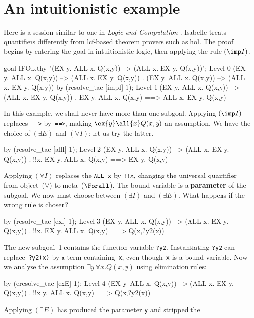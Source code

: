 \section{An intuitionistic example}
Here is a session similar to one in {\em Logic and Computation}
\cite[pages~222--3]{paulson87}.  Isabelle treats quantifiers differently
from {\sc lcf}-based theorem provers such as {\sc hol}.  The proof begins
by entering the goal in intuitionistic logic, then applying the rule
$({\imp}I)$.
\begin{ttbox}
goal IFOL.thy "(EX y. ALL x. Q(x,y)) -->  (ALL x. EX y. Q(x,y))";
{\out Level 0}
{\out (EX y. ALL x. Q(x,y)) --> (ALL x. EX y. Q(x,y))}
{. (EX y. ALL x. Q(x,y)) --> (ALL x. EX y. Q(x,y))}
\ttbreak
by (resolve_tac [impI] 1);
{\out Level 1}
{\out (EX y. ALL x. Q(x,y)) --> (ALL x. EX y. Q(x,y))}
{. EX y. ALL x. Q(x,y) ==> ALL x. EX y. Q(x,y)}
\end{ttbox}
In this example, we shall never have more than one subgoal.  Applying
$({\imp}I)$ replaces~\verb|-->| by~\verb|==>|, making
\(\ex{y}\all{x}Q(x,y)\) an assumption.  We have the choice of
$({\exists}E)$ and $({\forall}I)$; let us try the latter.
\begin{ttbox}
by (resolve_tac [allI] 1);
{\out Level 2}
{\out (EX y. ALL x. Q(x,y)) --> (ALL x. EX y. Q(x,y))}
{. !!x. EX y. ALL x. Q(x,y) ==> EX y. Q(x,y)}
\end{ttbox}
Applying $({\forall}I)$ replaces the \hbox{\tt ALL x} by \hbox{\tt!!x},
changing the universal quantifier from object~($\forall$) to
meta~($\Forall$).  The bound variable is a {\bf parameter} of the
subgoal.  We now must choose between $({\exists}I)$ and $({\exists}E)$.  What
happens if the wrong rule is chosen?
\begin{ttbox}
by (resolve_tac [exI] 1);
{\out Level 3}
{\out (EX y. ALL x. Q(x,y)) --> (ALL x. EX y. Q(x,y))}
{. !!x. EX y. ALL x. Q(x,y) ==> Q(x,?y2(x))}
\end{ttbox}
The new subgoal~1 contains the function variable {\tt?y2}.  Instantiating
{\tt?y2} can replace~{\tt?y2(x)} by a term containing~{\tt x}, even
though~{\tt x} is a bound variable.  Now we analyse the assumption
\(\exists y.\forall x. Q(x,y)\) using elimination rules:
\begin{ttbox}
by (eresolve_tac [exE] 1);
{\out Level 4}
{\out (EX y. ALL x. Q(x,y)) --> (ALL x. EX y. Q(x,y))}
{. !!x y. ALL x. Q(x,y) ==> Q(x,?y2(x))}
\end{ttbox}
Applying $(\exists E)$ has produced the parameter {\tt y} and stripped the
